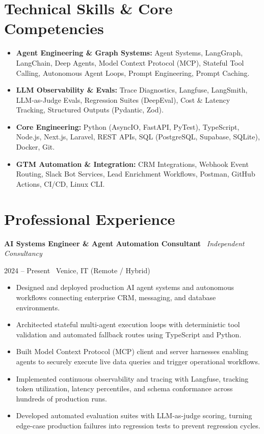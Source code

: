 \documentclass[a4paper,10pt]{article}
\newcommand{\role}[4]{%
  \vspace{2pt}\noindent
  \begin{minipage}[t]{0.70\textwidth}\raggedright\textbf{#1} \textbullet\ \textit{#3}\end{minipage}%
  \hfill
  \begin{minipage}[t]{0.28\textwidth}\raggedleft\footnotesize\color{gray}#2 \textbullet\ #4\end{minipage}%
  \vspace{1pt}%
}
\begin{document}
\section{Technical Skills \& Core Competencies}
\begin{itemize}[leftmargin=1.2em, itemsep=2pt]
  \item \textbf{Agent Engineering \& Graph Systems:} Agent Systems, LangGraph, LangChain, Deep Agents, Model Context Protocol (MCP), Stateful Tool Calling, Autonomous Agent Loops, Prompt Engineering, Prompt Caching.
  \item \textbf{LLM Observability \& Evals:} Trace Diagnostics, Langfuse, LangSmith, LLM-as-Judge Evals, Regression Suites (DeepEval), Cost \& Latency Tracking, Structured Outputs (Pydantic, Zod).
  \item \textbf{Core Engineering:} Python (AsyncIO, FastAPI, PyTest), TypeScript, Node.js, Next.js, Laravel, REST APIs, SQL (PostgreSQL, Supabase, SQLite), Docker, Git.
  \item \textbf{GTM Automation \& Integration:} CRM Integrations, Webhook Event Routing, Slack Bot Services, Lead Enrichment Workflows, Postman, GitHub Actions, CI/CD, Linux CLI.
\end{itemize}

\section{Professional Experience}

\role{AI Systems Engineer \& Agent Automation Consultant}{2024 -- Present}{Independent Consultancy}{Venice, IT (Remote / Hybrid)}
\begin{itemize}
  \item Designed and deployed production AI agent systems and autonomous workflows connecting enterprise CRM, messaging, and database environments.
  \item Architected stateful multi-agent execution loops with deterministic tool validation and automated fallback routes using TypeScript and Python.
  \item Built Model Context Protocol (MCP) client and server harnesses enabling agents to securely execute live data queries and trigger operational workflows.
  \item Implemented continuous observability and tracing with Langfuse, tracking token utilization, latency percentiles, and schema conformance across hundreds of production runs.
  \item Developed automated evaluation suites with LLM-as-judge scoring, turning edge-case production failures into regression tests to prevent regression cycles.
\end{itemize}
\end{document}
